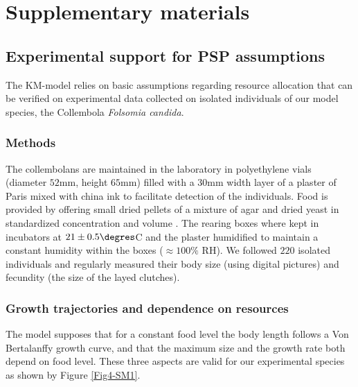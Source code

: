 \section{Supplementary materials}\label{sec:SupMat}
\subsection{Experimental support for PSP assumptions}\label{subsec:SupMat1}

The KM-model relies on basic assumptions regarding resource allocation that can
be verified on experimental data collected on isolated individuals of our model
species, the Collembola \textit{Folsomia candida}.

\subsubsection{Methods}

The collembolans are maintained in the laboratory in polyethylene vials
(diameter $52$mm, height $65$mm) filled with a $30$mm width layer of a plaster
of Paris mixed with china ink to facilitate detection of the individuals. Food
is provided by offering small dried pellets of a mixture of agar and dried yeast
in standardized concentration and volume \autocites{tully2008a}.
The rearing boxes where kept in incubators at $21 \pm 0.5\degres$C and the
plaster humidified to maintain a constant humidity within the boxes ($\approx
100\%$ RH). We followed $220$ isolated individuals and regularly measured their
body size (using digital pictures) and fecundity (the size of the layed
clutches).

\subsubsection{Growth trajectories and dependence on resources}

The model supposes that for a constant food level the body length follows a Von
Bertalanffy growth curve, and that the maximum size and the growth rate both
depend on food level. These three aspects are valid for our experimental species
as shown by Figure \ref{Fig4-SM1}.

